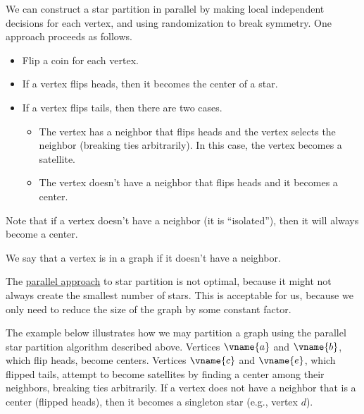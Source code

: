 \begin{flex}

\begin{gram}
\label{graphcon::star::partition::par}

We can construct a star partition in parallel by making local
independent decisions for each vertex, and using randomization to
break symmetry.
%
One approach proceeds as follows. 
%
\begin{itemize}
\item Flip a coin for each vertex.

\item If a vertex flips heads, then it becomes the center of a star. 
\item If a vertex flips tails, then there are two cases.
\begin{itemize}
\item The vertex has a neighbor that flips heads and the vertex selects the neighbor (breaking ties arbitrarily).  In this case, the vertex becomes a satellite.

\item The vertex doesn't have a neighbor that flips heads and it becomes a center. 
\end{itemize}
\end{itemize}

Note that if a vertex doesn't have a neighbor (it is ``isolated''), then it will always become a center.
\end{gram}

\begin{definition}
\label{graphcon::star::partition::random::isolated}
We say that a vertex is  in a graph if it doesn't have a neighbor.
\end{definition}

\begin{note}
The \href{graphcon::star::partition::par}{parallel approach}
%
to star partition is not optimal, because it might not always create
the smallest number of stars.
%
This is acceptable for us, because we only need to reduce the size of
the graph by some constant factor.
\end{note}

\begin{example}
\label{ex:graphcon::star::partition::random}

The example below illustrates how we may partition a graph using the parallel star partition algorithm described above.
%
Vertices $\vname{a}$ and $\vname{b}$, which flip heads, become
centers. Vertices $\vname{c}$ and $\vname{e}$, which flipped tails,
attempt to become satellites by finding a center among their
neighbors, breaking ties arbitrarily.
%
If a vertex does not have a neighbor that is a center (flipped heads),
then it becomes a singleton star (e.g., vertex $d$).
%


\end{example}
\end{flex}
